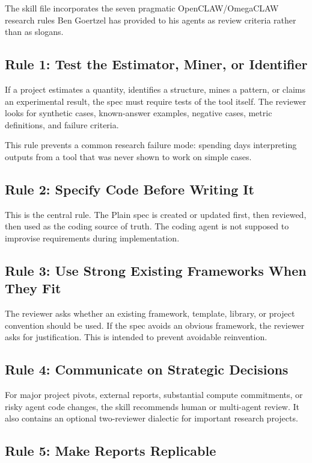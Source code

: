 \documentclass[11pt]{article}
\begin{document}
The skill file incorporates the seven pragmatic OpenCLAW/OmegaCLAW research rules Ben Goertzel
has provided to his agents as review
criteria rather than as slogans.

\subsection{Rule 1: Test the Estimator, Miner, or Identifier}

If a project estimates a quantity, identifies a structure, mines a pattern, or
claims an experimental result, the spec must require tests of the tool itself.
The reviewer looks for synthetic cases, known-answer examples, negative cases,
metric definitions, and failure criteria.

This rule prevents a common research failure mode: spending days interpreting
outputs from a tool that was never shown to work on simple cases.

\subsection{Rule 2: Specify Code Before Writing It}

This is the central rule. The Plain spec is created or updated first, then
reviewed, then used as the coding source of truth. The coding agent is not
supposed to improvise requirements during implementation.

\subsection{Rule 3: Use Strong Existing Frameworks When They Fit}

The reviewer asks whether an existing framework, template, library, or project
convention should be used. If the spec avoids an obvious framework, the reviewer
asks for justification. This is intended to prevent avoidable reinvention.

\subsection{Rule 4: Communicate on Strategic Decisions}

For major project pivots, external reports, substantial compute commitments, or
risky agent code changes, the skill recommends human or multi-agent review. It
also contains an optional two-reviewer dialectic for important research projects.

\subsection{Rule 5: Make Reports Replicable}
\end{document}
